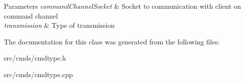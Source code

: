 \begin{DoxyParams}{Parameters}
{\em command\+Channel\+Socket} & Socket to communication with client on command channel \\
\hline
{\em transmission} & Type of transmission \\
\hline
\end{DoxyParams}


The documentation for this class was generated from the following files\+:\begin{DoxyCompactItemize}
\item 
src/cmds/cmdtype.\+h\item 
src/cmds/cmdtype.\+cpp\end{DoxyCompactItemize}
